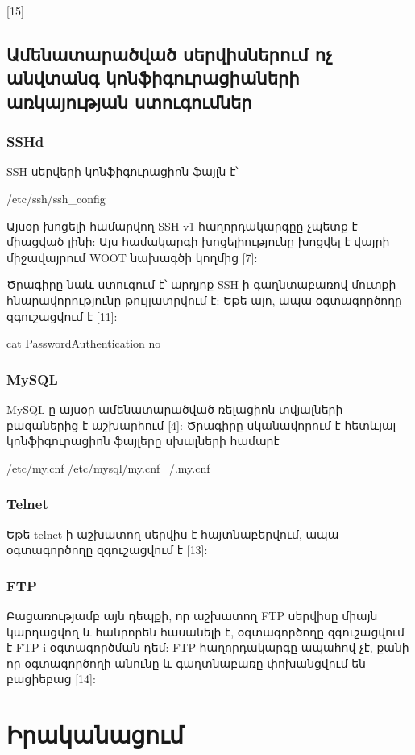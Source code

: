 \documentclass[a4paper,12pt]{article}
\begin{document}
\begin{sloppypar}
[15]


\subsection{Ամենատարածված սերվիսներում ոչ անվտանգ կոնֆիգուրացիաների առկայության ստուգումներ}

\subsubsection{SSHd}

SSH սերվերի կոնֆիգուրացիոն ֆայլն է՝

    /etc/ssh/ssh\_config

Այսօր խոցելի համարվող SSH v1 հաղորդակարգըը չպետք է միացված լինի:
Այս համակարգի խոցելիությունը խոցվել է վայրի միջավայրում WOOT
նախագծի կողմից [7]:

Ծրագիրը նաև ստուգում է՝ արդյոք SSH-ի գաղնտաբառով մուտքի
հնարավորությունը թույլատրվում է: Եթե այո, ապա օգտագործողը
զգուշացվում է [11]:

    cat PasswordAuthentication no

\subsubsection{MySQL}

MySQL-ը այսօր ամենատարածված ռելացիոն տվյալների բազաներից է աշխարհում [4]:
Ծրագիրը սկանավորում է հետևյալ կոնֆիգուրացիոն ֆայլերը սխալների համարէ

    /etc/my.cnf
    /etc/mysql/my.cnf
    ~/.my.cnf

\subsubsection{Telnet}

Եթե telnet-ի աշխատող սերվիս է հայտնաբերվում, ապա օգտագործողը զգուշացվում է [13]:

\subsubsection{FTP}

Բացառությամբ այն դեպքի, որ աշխատող FTP սերվիսը միայն կարդացվող և
հանրորեն հասանելի է, օգտագործողը զգուշացվում է FTP-i օգտագործման դեմ:
FTP հաղորդակարգը ապահով չէ, քանի որ օգտագործողի անունը և
գաղտնաբառը փոխանցվում են բացիեբաց [14]:


\section{Իրականացում}



\end{sloppypar}
\end{document}
